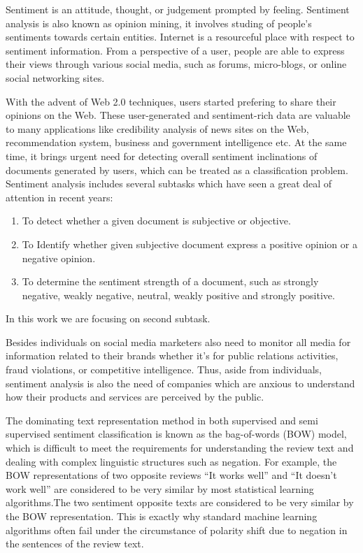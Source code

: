 \documentclass[oneside,a4paper,12pt]{pictreport}
\begin{document}
\par Sentiment is an attitude, thought, or judgement prompted by feeling. Sentiment analysis 
is also known as opinion mining, it involves studing of people’s sentiments towards 
certain entities. Internet is a resourceful place with respect to sentiment information. From a
perspective of a user, people are able to express their views through various social media,
such as forums, micro-blogs, or online social networking sites.

\par With the advent of Web 2.0 techniques,
users started prefering to share their opinions on the Web. These user-generated and 
sentiment-rich data are valuable to many applications like 
credibility analysis of news sites on the Web, recommendation system, business and 
government intelligence etc. At the same time, it brings
urgent need for detecting overall sentiment inclinations of
documents generated by users, which can be treated as a
classification problem. Sentiment analysis includes several
subtasks  which have seen a great deal of attention in recent years:
\begin{enumerate}
 \item To detect whether a given document is subjective or objective.
  \item To Identify whether given subjective document express a positive opinion or a negative opinion.
  \item To determine the sentiment strength of a document,
such as strongly negative, weakly negative, neutral, weakly
positive and strongly positive.
\end{enumerate}

In this work we are focusing on second subtask.

\par Besides individuals on social media marketers also need to monitor all media for information related to their brands
whether it’s for public relations activities, fraud violations, or competitive intelligence.
Thus, aside from individuals, sentiment analysis is also the need of companies which are anxious to understand how
their products and services are perceived by the public.

\par The dominating text representation method in
both supervised and 
semi supervised sentiment
classification is known as the bag-of-words (BOW)
model, which is difficult to meet the requirements
for understanding the review text and dealing with
complex linguistic structures such as negation. For
example, the BOW representations of two opposite
reviews ``It works well'' and ``It doesn't work well''
are considered to be very similar by most statistical
learning algorithms.The two sentiment opposite texts are considered to be very similar by the
BOW representation. This is exactly why standard machine learning algorithms often
fail under the circumstance of polarity shift due to negation in the sentences of the review text.
\end{document}
